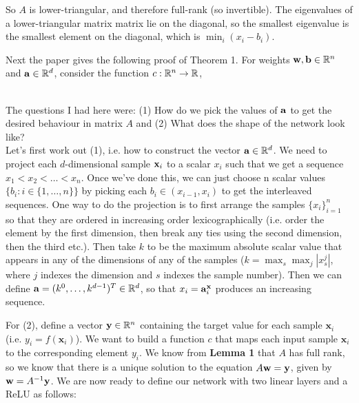 So $A$ is lower-triangular, and therefore full-rank (so invertible).  The eigenvalues of a lower-triangular matrix matrix lie on the diagonal, so the smallest eigenvalue is the smallest element on the diagonal, which is $\min_i (x_i - b_i)$.

Next the paper gives the following proof of Theorem 1.  For weights $\mathbf{w}, \mathbf{b} \in \mathbb{R}^n$ and $\mathbf{a} \in \mathbb{R}^d$, consider the function $c: \mathbb{R}^n \to \mathbb{R}$, 


 \\

The questions I had here were: (1) How do we pick the values of $\mathbf{a}$ to get the desired behaviour in matrix $A$ and (2) What does the shape of the network look like? \\

Let's first work out (1), i.e. how to construct the vector $\mathbf{a} \in \mathbb{R}^d$. We need to project each $d$-dimensional sample $\mathbf{x}_i$ to a scalar $x_i$ such that we get a sequence $x_1 < x_2 < \dots < x_n$. Once we've done this, we can just choose n  scalar values $\{b_i: i \in \{1, \dots, n\}\}$ by picking each $b_i \in (x_{i-1}, x_i)$ to get the interleaved sequences.  One way to do the projection is to first arrange the samples $\{ x_i \}_{i=1}^n$ so that they are ordered in increasing order lexicographically (i.e. order the element by the first dimension, then break any ties using the second dimension, then the third etc.).  Then take $k$ to be the maximum absolute scalar value that appears in any of the dimensions of any of the samples ($k = \max_s \max_j |x_s^j|$, where $j$ indexes the dimension and $s$ indexes the sample number). Then we can define $\mathbf{a} = (k^0, \dots, k^{d-1})^T \in \mathbb{R}^d$, so that $x_i = \mathbf{a}^{\mathbf{x}}_i$ produces an increasing sequence.

For (2), define a vector $\mathbf{y} \in \mathbb{R}^n$ containing the target value for each sample $\mathbf{x}_i$ (i.e. $y_i = f(\mathbf{x}_i)$).  We want to build a function $c$ that maps each input sample $\mathbf{x}_i$ to the corresponding element $y_i$.  We know from \textbf{Lemma 1} that $A$ has full rank, so we know that there is a unique solution to the equation $A \mathbf{w} = \mathbf{y}$, given by $\mathbf{w} = A^{-1}\mathbf{y}$. We are now ready to define our network with two linear layers and a ReLU as follows:

